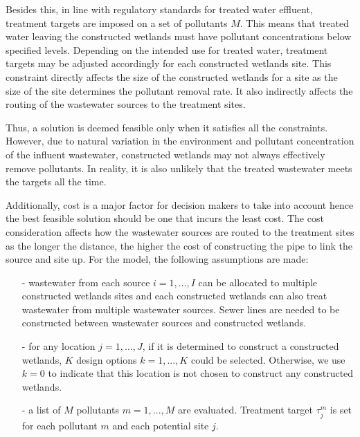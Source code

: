 \documentclass[preprint,12pt,authoryear]{elsarticle}
\begin{document}
Besides this, in line with regulatory standards for treated water effluent, treatment targets are imposed on a set of pollutants $M$. This means that treated water leaving the constructed wetlands must have pollutant concentrations below specified levels. Depending on the intended use for treated water, treatment targets may be adjusted accordingly for each constructed wetlands site. This constraint directly affects the size of the constructed wetlands for a site as the size of the site determines the pollutant removal rate. It also indirectly affects the routing of the wastewater sources to the treatment sites. 

Thus, a solution is deemed feasible only when it satisfies all the constraints. However, due to natural variation in the environment and pollutant concentration of the influent wastewater, constructed wetlands may not always effectively remove pollutants. In reality, it is also unlikely that the treated wastewater meets the targets all the time. 

Additionally, cost is a major factor for decision makers to take into account hence the best feasible solution should be one that incurs the least cost. The cost consideration affects how the wastewater sources are routed to the treatment sites as the longer the distance, the higher the cost of constructing the pipe to link the source and site up. For the model, the following assumptions are made:

\begin{itemize}
	\setlength{\itemsep}{0pt}
	\setlength{\parskip}{0pt}
	\setlength{\parsep}{0pt}
	\item[-] wastewater from each source $i=1,...,I$ can be allocated to multiple constructed wetlands sites and each constructed wetlands can also treat wastewater from multiple wastewater sources. Sewer lines are needed to be constructed between wastewater sources and constructed wetlands. 
	\item[-] for any location $j=1,...,J$, if it is determined to construct a constructed wetlands, $K$ design options $k=1,...,K$ could be selected. Otherwise, we use $k=0$ to indicate that this location is not chosen to construct any constructed wetlands. 
	\item[-] a list of $M$ pollutants $m=1,...,M$ are evaluated. Treatment target $\tau_j^m$ is set for each pollutant $m$ and each potential site $j$.
\end{itemize}
\end{document}
